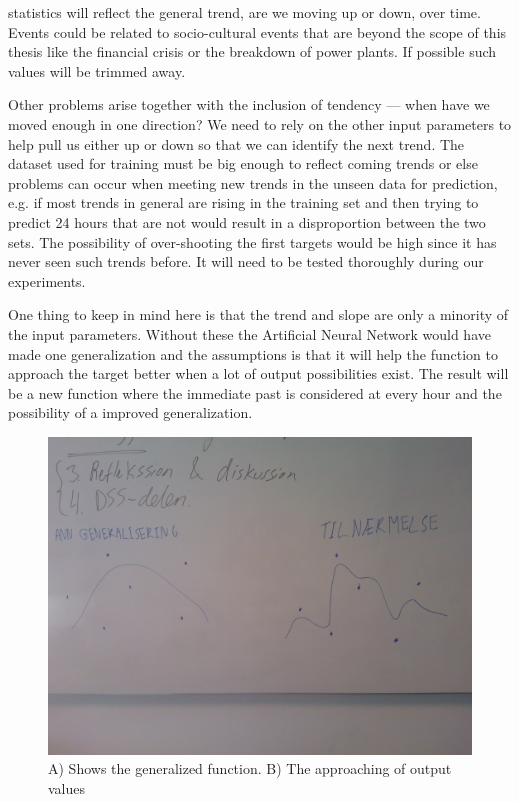 statistics will reflect the general trend, are we moving up or down, over time. Events could be related to socio-cultural events that are beyond the scope of this thesis like the financial crisis or the breakdown of power plants. If possible such values will be trimmed away.

Other problems arise together with the inclusion of tendency --- when have we moved enough in one direction? We need to rely on the other input parameters to help pull us either up or down so that we can identify the next trend. The dataset used for training must be big enough to reflect coming trends or else problems can occur when meeting new trends in the unseen data for prediction, e.g. if most trends in general are rising in the training set and then trying to predict 24 hours that are not would result in a disproportion between the two sets. The possibility of over-shooting the first targets would be high since it has never seen such trends before. It will need to be tested thoroughly during our experiments. 

One thing to keep in mind here is that the trend and slope are only a minority of the input parameters. Without these the Artificial Neural Network would have made one generalization and the assumptions is that it will help the function to approach the target better when a lot of output possibilities exist. The result will be a new function where the immediate past is considered at every hour and the possibility of a improved generalization.

\begin{figure}[H]
\centering
\includegraphics[width=0.99\linewidth,natwidth=898,natheight=587]{billeder/WP_000057.jpg}
\caption{A) Shows the generalized function. B) The approaching of output values}
\label{fig:WP}
\end{figure}

